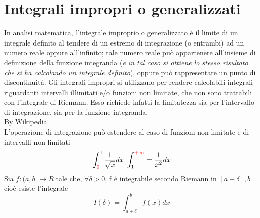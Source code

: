 \section{Integrali impropri o generalizzati}
In analisi matematica, l'integrale improprio o generalizzato è il limite di un integrale definito al tendere di un estremo di integrazione (o entrambi) ad un numero reale oppure all'infinito; tale numero reale può appartenere all'insieme di definizione della funzione integranda (\textit{e in tal caso si ottiene lo stesso risultato che si ha calcolando un integrale definito}), oppure può rappresentare un punto di discontinuità. Gli integrali impropri si utilizzano per rendere calcolabili integrali riguardanti intervalli illimitati e/o funzioni non limitate, che non sono trattabili con l'integrale di Riemann. Esso richiede infatti la limitatezza sia per l'intervallo di integrazione, sia per la funzione integranda.\\ By \href{https://it.wikipedia.org/wiki/Integrale_improprio}{Wikipedia}\\
L'operazione di integrazione può estendere al caso di funzioni non limitate e di intervalli non limitati
\begin{equation}
	\int^{1}_{{\color{red}0}}\frac{1}{\sqrt{x}}dx\text{ } \int^{{\color{red} +\infty}}_1=\frac{1}{x^2}dx
\end{equation}
Sia $f:(a,b]\to R$ tale che, $\forall\delta >0$, f è integrabile secondo Riemann in $[a+\delta],b$ cioè esiste l'integrale
\begin{equation}
	I(\delta) =\int^{b}_{a+\delta}f(x)dx
\end{equation}
